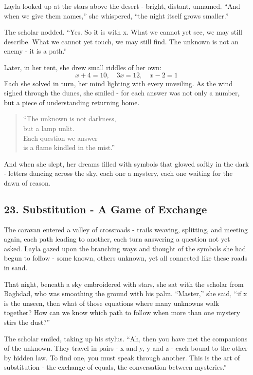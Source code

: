 \documentclass[
  letterpaper,
  DIV=11,
  numbers=noendperiod]{scrreprt}
\begin{document}
Layla looked up at the stars above the desert - bright, distant,
unnamed. ``And when we give them names,'' she whispered, ``the night
itself grows smaller.''

The scholar nodded. ``Yes. So it is with x. What we cannot yet see, we
may still describe. What we cannot yet touch, we may still find. The
unknown is not an enemy - it is a path.''

Later, in her tent, she drew small riddles of her own: \[
x + 4 = 10, \quad 3x = 12, \quad x - 2 = 1
\] Each she solved in turn, her mind lighting with every unveiling. As
the wind sighed through the dunes, she smiled - for each answer was not
only a number, but a piece of understanding returning home.

\begin{quote}
``The unknown is not darkness,\\
but a lamp unlit.\\
Each question we answer\\
is a flame kindled in the mist.''
\end{quote}

And when she slept, her dreams filled with symbols that glowed softly in
the dark - letters dancing across the sky, each one a mystery, each one
waiting for the dawn of reason.

\subsection{23. Substitution - A Game of
Exchange}\label{substitution---a-game-of-exchange}

The caravan entered a valley of crossroads - trails weaving, splitting,
and meeting again, each path leading to another, each turn answering a
question not yet asked. Layla gazed upon the branching ways and thought
of the symbols she had begun to follow - some known, others unknown, yet
all connected like these roads in sand.

That night, beneath a sky embroidered with stars, she sat with the
scholar from Baghdad, who was smoothing the ground with his palm.
``Master,'' she said, ``if x is the unseen, then what of those equations
where many unknowns walk together? How can we know which path to follow
when more than one mystery stirs the dust?''

The scholar smiled, taking up his stylus. ``Ah, then you have met the
companions of the unknown. They travel in pairs - x and y, y and z -
each bound to the other by hidden law. To find one, you must speak
through another. This is the art of substitution - the exchange of
equals, the conversation between mysteries.''
\end{document}
